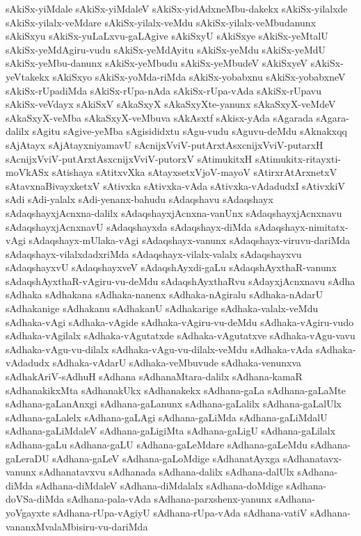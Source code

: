{sAkiSx-yiMdale
sAkiSx-yiMdaleV
sAkiSx-yidAdxneMbu-dakekx
sAkiSx-yilalxde
sAkiSx-yilalx-veMdare
sAkiSx-yilalx-veMdu
sAkiSx-yilalx-veMbudanunx
sAkiSxyu
sAkiSx-yuLaLxvu-gaLAgive
sAkiSxyU
sAkiSxye
sAkiSx-yeMtalU
sAkiSx-yeMdAgiru-vudu
sAkiSx-yeMdAyitu
sAkiSx-yeMdu
sAkiSx-yeMdU
sAkiSx-yeMbu-danunx
sAkiSx-yeMbudu
sAkiSx-yeMbudeV
sAkiSxyeV
sAkiSx-yeVtakekx
sAkiSxyo
sAkiSx-yoMda-riMda
sAkiSx-yobabxnu
sAkiSx-yobabxneV
sAkiSx-rUpadiMda
sAkiSx-rUpa-nAda
sAkiSx-rUpa-vAda
sAkiSx-rUpavu
sAkiSx-veVdayx
sAkiSxV
sAkaSxyX
sAkaSxyXte-yanunx
sAkaSxyX-veMdeV
sAkaSxyX-veMba
sAkaSxyX-veMbuva
sAkAsxtf
sAkisx-yAda
sAgarada
sAgara-dalilx
sAgitu
sAgive-yeMba
sAgisididxtu
sAgu-vudu
sAguvu-deMdu
sAknakxqq
sAjAtayx
sAjAtayxniyamavU
sAcnijxVviV-putArxtAsxcnijxVviV-putarxH
sAcnijxVviV-putArxtAsxcnijxVviV-putorxV
sAtimukitxH
sAtimukitx-ritayxti-moVkASx
sAtishaya
sAtitxvXka
sAtayxsetxVjoV-mayoV
sAtirxrAtArxnetxV
sAtavxnaBivayxketxV
sAtivxka
sAtivxka-vAda
sAtivxka-vAdadudxI
sAtivxkiV
sAdi
sAdi-yalalx
sAdi-yenanx-bahudu
sAdaqshavu
sAdaqshayx
sAdaqshayxjAcnxna-dalilx
sAdaqshayxjAcnxna-vanUnx
sAdaqshayxjAcnxnavu
sAdaqshayxjAcnxnavU
sAdaqshayxda
sAdaqshayx-diMda
sAdaqshayx-nimitatx-vAgi
sAdaqshayx-mUlaka-vAgi
sAdaqshayx-vanunx
sAdaqshayx-viruvu-dariMda
sAdaqshayx-vilalxdadxriMda
sAdaqshayx-vilalx-valalx
sAdaqshayxvu
sAdaqshayxvU
sAdaqshayxveV
sAdaqshAyxdi-gaLu
sAdaqshAyxthaR-vanunx
sAdaqshAyxthaR-vAgiru-vu-deMdu
sAdaqshAyxthaRvu
sAdayxjAcnxnavu
sAdha
sAdhaka
sAdhakana
sAdhaka-nanenx
sAdhaka-nAgiralu
sAdhaka-nAdarU
sAdhakanige
sAdhakanu
sAdhakanU
sAdhakarige
sAdhaka-valalx-veMdu
sAdhaka-vAgi
sAdhaka-vAgide
sAdhaka-vAgiru-vu-deMdu
sAdhaka-vAgiru-vudo
sAdhaka-vAgilalx
sAdhaka-vAgutatxde
sAdhaka-vAgutatxve
sAdhaka-vAgu-vavu
sAdhaka-vAgu-vu-dilalx
sAdhaka-vAgu-vu-dilalx-veMdu
sAdhaka-vAda
sAdhaka-vAdadudx
sAdhaka-vAdarU
sAdhaka-veMbuvude
sAdhaka-venunxva
sAdhakAriV-sAdhuH
sAdhana
sAdhanaMtara-dalilx
sAdhana-kamaR
sAdhanakikxMta
sAdhanakUkx
sAdhanakekx
sAdhana-gaLa
sAdhana-gaLaMte
sAdhana-gaLanAnxgi
sAdhana-gaLanunx
sAdhana-gaLalilx
sAdhana-gaLalUlx
sAdhana-gaLalelx
sAdhana-gaLAgi
sAdhana-gaLiMda
sAdhana-gaLiMdalU
sAdhana-gaLiMdaleV
sAdhana-gaLigiMta
sAdhana-gaLigU
sAdhana-gaLilalx
sAdhana-gaLu
sAdhana-gaLU
sAdhana-gaLeMdare
sAdhana-gaLeMdu
sAdhana-gaLeraDU
sAdhana-gaLeV
sAdhana-gaLoMdige
sAdhanatAyxga
sAdhanatavx-vanunx
sAdhanatavxvu
sAdhanada
sAdhana-dalilx
sAdhana-dalUlx
sAdhana-diMda
sAdhana-diMdaleV
sAdhana-diMdalalx
sAdhana-doMdige
sAdhana-doVSa-diMda
sAdhana-pala-vAda
sAdhana-parxshenx-yanunx
sAdhana-yoVgayxte
sAdhana-rUpa-vAgiyU
sAdhana-rUpa-vAda
sAdhana-vatiV
sAdhana-vananxMvalaMbisiru-vu-dariMda
}
